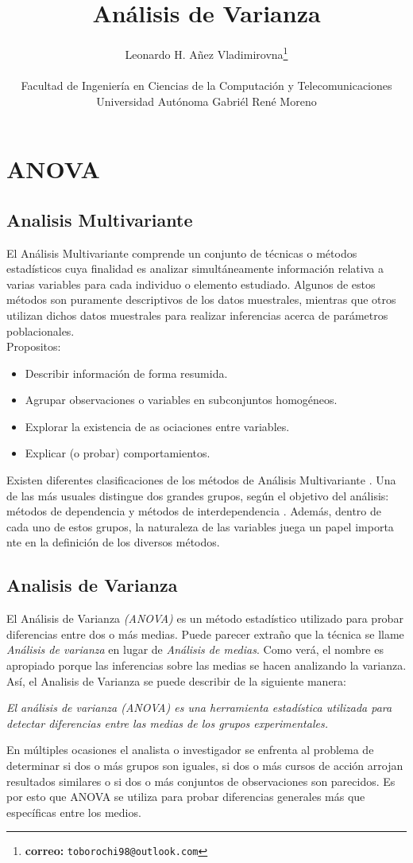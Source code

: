 \documentclass[10pt,letterpaper]{article}
\author{Leonardo H. Añez Vladimirovna\footnote{\textbf{correo:} \texttt{toborochi98@outlook.com}} \\ \vspace{0.1cm} \\
Facultad de Ingeniería en Ciencias de la Computación y Telecomunicaciones\\
Universidad Autónoma Gabriél René Moreno}
\title{Análisis de Varianza}
\begin{document}
\maketitle
\section{ANOVA}
\subsection{Analisis Multivariante}
El Análisis  Multivariante comprende  un  conjunto  de  técnicas  o  métodos  estadísticos  cuya finalidad es analizar simultáneamente información relativa a varias variables para cada  individuo  o  elemento  estudiado.  Algunos  de  estos  métodos  son  puramente descriptivos de los datos muestrales, mientras que otros utilizan dichos datos muestrales para realizar inferencias acerca de parámetros poblacionales.  
\\ ${ }$ \\
Propositos:
\begin{itemize}
\item Describir información de forma resumida. 
\item Agrupar observaciones o variables en subconjuntos homogéneos. 
\item Explorar la existencia de as
ociaciones entre variables. 
\item Explicar (o probar) comportamientos.
\end{itemize}
Existen diferentes 
clasificaciones de los métodos
 de Análisis Multivariante
. Una de las 
más  usuales  distingue  dos  grandes  grupos,  según  el  objetivo  del  análisis:  métodos  de  
dependencia  y  métodos  de  interdependencia
.  Además,  dentro  de  cada  uno  de  estos  
grupos, la naturaleza de las 
variables juega un papel importa
nte en la definición de los 
diversos  métodos. 
\subsection{Analisis de Varianza}
El Análisis de Varianza \textit{(ANOVA)} es un método estadístico utilizado para probar diferencias
entre dos o más medias. Puede parecer extraño que la técnica se llame \textit{Análisis de varianza} en lugar de \textit{Análisis de medias}. Como verá, el nombre es apropiado porque las inferencias sobre las medias se hacen analizando la varianza. Así, el Analisis de Varianza se puede describir de la siguiente manera:\\
\begin{tcolorbox}[enhanced,width=7in,center upper,size=fbox,
    fontupper=\large,drop shadow southwest,sharp corners]
\textit{El análisis de varianza (ANOVA) es una herramienta estadística utilizada para detectar diferencias entre las medias de los grupos experimentales.}
\end{tcolorbox}
En múltiples ocasiones el analista o investigador se enfrenta al problema de determinar 
si  dos  o  más  grupos son iguales, si dos o más cursos de acción arrojan resultados similares o 
si dos o más conjuntos de observaciones son parecidos. Es por esto que ANOVA se utiliza para probar diferencias generales más que específicas entre los medios. 
\end{document}
